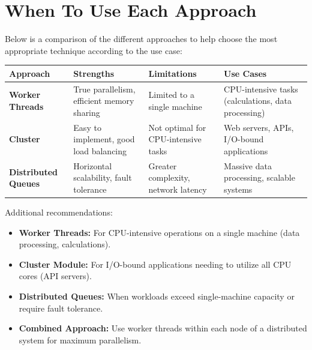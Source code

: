 \section{When To Use Each Approach}

Below is a comparison of the different approaches to help choose the most appropriate technique according to the use case:

\begin{center}
\small  %
\begin{tabular}{|p{3cm}|p{3.5cm}|p{3.5cm}|p{3.5cm}|}
\hline
\textcolor{accentColor}{\textbf{Approach}} & \textcolor{primaryColor}{\textbf{Strengths}} & \textcolor{primaryColor}{\textbf{Limitations}} & \textcolor{primaryColor}{\textbf{Use Cases}} \\
\hline
\textbf{\textcolor{accentColor}{Worker Threads}} & 
True parallelism, efficient memory sharing & 
Limited to a single machine & 
CPU-intensive tasks (calculations, data processing) \\
\hline
\textbf{\textcolor{accentColor}{Cluster}} & 
Easy to implement, good load balancing & 
Not optimal for CPU-intensive tasks & 
Web servers, APIs, I/O-bound applications \\
\hline
\textbf{\textcolor{accentColor}{Distributed Queues}} & 
Horizontal scalability, fault tolerance & 
Greater complexity, network latency & 
Massive data processing, scalable systems \\
\hline
\end{tabular}
\end{center}


Additional recommendations:
\begin{itemize}
    \item \textbf{\textcolor{accentColor}{Worker Threads:}} For CPU-intensive operations on a single machine (data processing, calculations).
    
    \item \textbf{\textcolor{accentColor}{Cluster Module:}} For I/O-bound applications needing to utilize all CPU cores (API servers).
    
    \item \textbf{\textcolor{accentColor}{Distributed Queues:}} When workloads exceed single-machine capacity or require fault tolerance.
    
    \item \textbf{\textcolor{accentColor}{Combined Approach:}} Use worker threads within each node of a distributed system for maximum parallelism.
\end{itemize}

